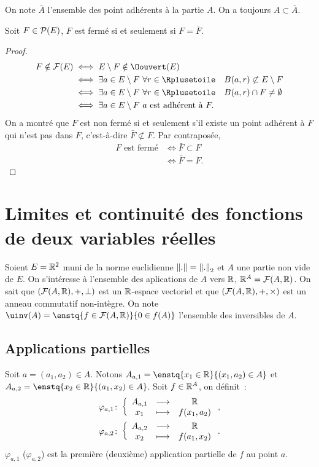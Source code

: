 On note $\bar{A}$ l'ensemble des point adhérents à la partie $A$. On a toujours $A \subset \bar{A}$.

\begin{prop}
  Soit $F \in \P(E)$, $F$ est fermé si et seulement si $F=\bar{F}$.
\end{prop}
\begin{proof}
  \begin{align}
    F \notin \F(E) &\iff E\setminus F \notin \Oouvert(E) \\
    &\iff \exists a \in E\setminus F \ \forall r \in \Rplusetoile \quad B(a, r) \not\subset E\setminus F \\
    &\iff \exists a \in E\setminus F \ \forall r \in \Rplusetoile \quad B(a, r) \cap F \neq \emptyset \\
    &\iff \exists a \in E\setminus F \ a \text{~est adhérent à~} F.
  \end{align}
  On a montré que $F$ est non fermé si et seulement s'il existe un point adhérent à $F$ qui n'est pas dans $F$, c'est-à-dire $\bar{F} \not\subset F$. Par contraposée,
  \begin{align}
    F \text{~est fermé} &\iff \bar{F} \subset F \\
    &\iff \bar{F}=F.
  \end{align}
\end{proof}

\section{Limites et continuité des fonctions de deux variables réelles}

Soient $E=\R^2$ muni de la norme euclidienne $\norme{.}=\norme{.}_2$ et $A$ une partie non vide de $E$. On s'intéresse à l'ensemble des aplications de $A$ vers $\R$, $\R^A=\F(A, \R)$. On sait que $(\F(A, \R), +, \perp)$ est un $\R$-espace vectoriel et que $(\F(A, \R), +, \times)$ est un anneau commutatif non-intègre. On note $\uinv(A)=\enstq{f \in \F(A, \R)}{0 \in f(A)}$ l'ensemble des inversibles de $A$.

\subsection{Applications partielles}

Soit $a=(a_1, a_2) \in A$. Notons $A_{a, 1}=\enstq{x_1 \in \R}{(x_1, a_2) \in A}$ et $A_{a, 2}=\enstq{x_2 \in \R}{(a_1, x_2) \in A}$. Soit $f \in \R^A$, on définit~:
\begin{gather}
  \fonction{\varphi_{a, 1}}{A_{a, 1}}{\R}{x_1}{f(x_1, a_2)}, \\ \fonction{\varphi_{a, 2}}{A_{a, 2}}{\R}{x_2}{f(a_1, x_2)}.
\end{gather}
$\varphi_{a, 1}$ ($\varphi_{a, 2}$) est la première (deuxième) application partielle de $f$ au point $a$.

